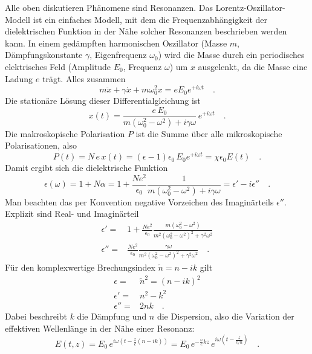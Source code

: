 Alle oben diskutieren Phänomene sind Resonanzen. Das Lorentz-Oszillator-Modell ist ein einfaches Modell, mit dem die Frequenzabhängigkeit der dielektrischen Funktion in der Nähe solcher Resonanzen beschrieben werden kann. In einem gedämpften harmonischen Oszillator (Masse $m$, Dämpfungskonstante $\gamma$, Eigenfrequenz $\omega_0$) wird die Masse durch ein periodisches elektrisches Feld (Amplitude $E_0$, Frequenz $\omega$) um $x$ ausgelenkt, da die Masse eine Ladung $e$ trägt. Alles zusammen
\begin{equation}
 m \ddot{x} +  \gamma \dot{x} + m \omega_0^2  x = e E_0 e^{+ i \omega t} \quad .
\end{equation}
Die stationäre Lösung dieser Differentialgleichung ist
\begin{equation}
 x(t) =  \frac{e \, E_0}{m (\omega_0^2  - \omega^2) + i \gamma \omega} \, e^{+ i \omega t} \quad .
\end{equation}
Die makroskopische Polarisation $P$ ist die Summe über alle mikroskopische Polarisationen, also
\begin{equation}
P(t) = N \, e \,x(t) =  (\epsilon -1 ) \epsilon_0 \, E_0 e^{+ i \omega t}
= \chi \epsilon_0 E(t) \quad .
\end{equation}
Damit ergibt sich die dielektrische Funktion
\begin{equation}
\epsilon(\omega) = 1 + N \alpha = 1 +\frac{N e^2}{\epsilon_0} \frac{1}{m (\omega_0^2  - \omega^2) + i \gamma \omega} = \epsilon' - i \epsilon'' \quad .
\end{equation}
Man beachten das per Konvention negative Vorzeichen des Imaginärteils $\epsilon''$. Explizit sind Real- und Imaginärteil
\begin{align}
 \epsilon' = & 1 + \frac{N e^2}{\epsilon_0} \frac{ m (\omega_0^2  - \omega^2)}{m^2 (\omega_0^2  - \omega^2)^2 +  \gamma^2 \omega^2}  \\
  \epsilon'' = &  \frac{N e^2}{\epsilon_0} \frac{ \gamma \omega }{m^2 (\omega_0^2  - \omega^2)^2 +  \gamma^2 \omega^2}  \quad .
\end{align}
Für den  komplexwertige Brechungsindex $\tilde{n} = n - i k$ gilt
\begin{align}
 \epsilon = & \tilde{n}^2 = (n - i k)^2 \\
  \epsilon' =& n^2 - k^2 \\
 \epsilon'' = & 2 n k \quad .
\end{align}
Dabei beschreibt $k$ die Dämpfung und $n$ die Dispersion, also die Variation der effektiven Wellenlänge in der Nähe einer Resonanz:
\begin{equation}
E(t,z) = E_0 \, e^{i \omega (t - \frac{z}{c}(n - i k))} = 
 E_0 \, e^{ - \frac{\omega}{c} k z}  
 \, e^{i \omega (t - \frac{z}{c/n} )}  \quad .
\end{equation}

